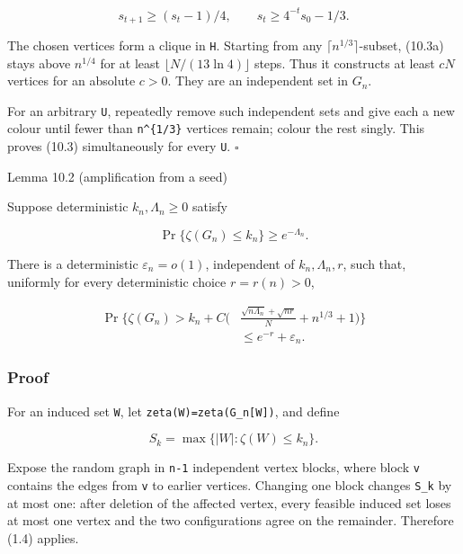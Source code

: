 \documentclass[
  11pt,
  a4paper,
]{article}
\begin{document}
\[
 s_{t+1}\ge(s_t-1)/4,\qquad s_t\ge4^{-t}s_0-1/3.         \tag{10.3a}
\]

The chosen vertices form a clique in \texttt{H}. Starting from any
\(\lceil n^{1/3}\rceil\)-subset, (10.3a) stays above \(n^{1/4}\) for at
least \(\lfloor N/(13\ln4)\rfloor\) steps. Thus it constructs at least
\(cN\) vertices for an absolute \(c>0\). They are an independent set in
\(G_n\).

For an arbitrary \texttt{U}, repeatedly remove such independent sets and
give each a new colour until fewer than \texttt{n\^{}\{1/3\}} vertices
remain; colour the rest singly. This proves (10.3) simultaneously for
every \texttt{U}. \(\square\)

{}
\label{lemma-10.2-amplification-from-a-seed}
\begin{lemmabox}{Lemma 10.2 (amplification from a seed)}

Suppose deterministic \(k_n,\Lambda_n\ge0\) satisfy

\[
 \Pr\{\zeta(G_n)\le k_n\}\ge e^{-\Lambda_n}.             \tag{10.4}
\]

There is a deterministic \(\varepsilon_n=o(1)\), independent of
\(k_n,\Lambda_n,r\), such that, uniformly for every deterministic choice
\(r=r(n)>0\),

\[
\begin{split}
 \Pr\Bigg\{\zeta(G_n)>k_n+C\bigg(
 &\frac{\sqrt{n\Lambda_n}+\sqrt{nr}}N
   +n^{1/3}+1\bigg)\Bigg\}\\
 &\le e^{-r}+\varepsilon_n.                              \end{split}
\tag{10.5}
\]

\end{lemmabox}

\subsubsection{Proof}\label{proof-10}

For an induced set \texttt{W}, let
\texttt{zeta(W)}\allowbreak{}\texttt{=}\allowbreak{}\texttt{zeta(G\_}\allowbreak{}\texttt{n{[}W{]}}\allowbreak{}\texttt{)},
and define

\[
 S_k=\max\{|W|:\zeta(W)\le k_n\}.                       \tag{10.6}
\]

Expose the random graph in \texttt{n-1} independent vertex blocks, where
block \texttt{v} contains the edges from \texttt{v} to earlier vertices.
Changing one block changes \texttt{S\_k} by at most one: after deletion
of the affected vertex, every feasible induced set loses at most one
vertex and the two configurations agree on the remainder. Therefore
(1.4) applies.
\end{document}

